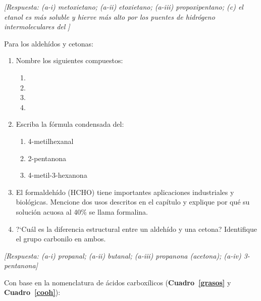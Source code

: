 \begin{bloque_ejercicios}
\begin{ejercicios}
\textit{[Respuesta: (a-i) metoxietano; (a-ii) etoxietano;
(a-iii) propoxipentano;
(c) el etanol es m\'as soluble y hierve m\'as alto por
los puentes de hidr\'ogeno intermoleculares del ]}

\item Para los aldeh\'idos y cetonas:

\begin{enumerate}[label=\alph*)]
    \item Nombre los siguientes compuestos:
          \begin{enumerate}[label=\roman*)]
              \item {}
              \item {}
              \item {}
              \item {}
          \end{enumerate}
    \item Escriba la f\'ormula condensada del:
          \begin{enumerate}[label=\roman*)]
              \item 4-metilhexanal
              \item 2-pentanona
              \item 4-metil-3-hexanona
          \end{enumerate}
    \item El formaldeh\'ido (HCHO) tiene importantes aplicaciones
          industriales y biol\'ogicas. Mencione dos usos descritos
          en el cap\'itulo y explique por qu\'e su soluci\'on
          acuosa al 40\% se llama formalina.
    \item ?`Cu\'al es la diferencia estructural entre un aldeh\'ido
          y una cetona? Identifique el grupo carbonilo en ambos.
\end{enumerate}

\textit{[Respuesta: (a-i) propanal; (a-ii) butanal;
(a-iii) propanona (acetona); (a-iv) 3-pentanona]}

\item Con base en la nomenclatura de \'acidos carbox\'ilicos
(\textbf{Cuadro~\ref{grasos}} y \textbf{Cuadro~\ref{cooh}}):


\end{ejercicios}
\end{bloque_ejercicios}
